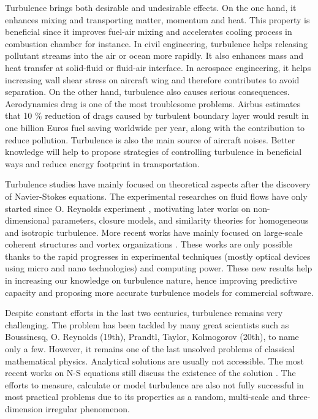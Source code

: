 Turbulence brings both desirable and undesirable effects. On the one hand, it enhances mixing and transporting matter, momentum and heat. This property is beneficial since it improves fuel-air mixing and accelerates cooling process in combustion chamber for instance. In civil engineering, turbulence helps releasing pollutant streams into the air or ocean more rapidly. It also enhances mass and heat transfer at solid-fluid or fluid-air interface. In aerospace engineering, it helps increasing wall shear stress on aircraft wing and therefore contributes to avoid separation. On the other hand, turbulence also causes serious consequences. Aerodynamics drag is one of the most troublesome problems. Airbus estimates that 10 $ \% $ reduction of drags caused by turbulent boundary layer would result in one billion Euros fuel saving worldwide per year, along with the contribution to reduce pollution. Turbulence is also the main source of aircraft noises. Better knowledge will help to propose strategies of controlling turbulence in beneficial ways and reduce energy footprint in transportation.

Turbulence studies have mainly focused on theoretical aspects after the discovery of Navier-Stokes equations. The experimental researches on fluid flows have only started since O. Reynolds experiment \citep{reynolds1883experimental}, motivating later works on non-dimensional parameters, closure models, and similarity theories for homogeneous and isotropic turbulence. More recent works have mainly focused on large-scale coherent structures and vortex organizations \citep{hutchins2007evidence}. These works are only possible thanks to the rapid progresses in experimental techniques (mostly optical devices using micro and nano technologies) and computing power. These new results help in increasing our knowledge on turbulence nature, hence improving predictive capacity and proposing more accurate turbulence models for commercial software.
	
Despite constant efforts in the last two centuries, turbulence remains very challenging. The problem has been tackled by many great scientists such as Boussinesq, O. Reynolds (19th), Prandtl, Taylor, Kolmogorov (20th), to name only a few. However, it remains one of the last unsolved problems of classical mathematical physics. Analytical solutions are usually not accessible. The most recent works on N-S equations still discuss the existence of the solution \citep{gallagher2003asymptotics, chemin2009wellposedness, gallagher2015some}. The efforts to measure, calculate or model turbulence are also not fully successful in most practical problems due to its properties as a random, multi-scale and three-dimension irregular phenomenon.

